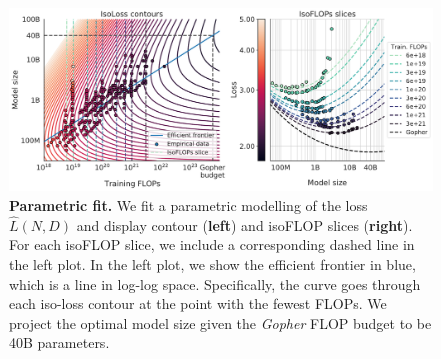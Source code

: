 \documentclass[11pt, a4paper, logo, copyright, nonumbering]{deepmind}
\newcommand{\gopher}{\textit{Gopher}\xspace}
\begin{document}
\begin{figure}
    \centering
    \includegraphics[width=\textwidth]{figures/approach_3_v2.pdf}
    \caption{\textbf{Parametric fit.} We fit a parametric modelling of the loss $\hat L(N,D)$ and display contour (\textbf{left}) and isoFLOP slices (\textbf{right}).
    For each isoFLOP slice, we include a corresponding dashed line in the left plot.
    In the left plot, we show the efficient frontier in blue, which is a line in log-log space. 
    Specifically, the curve goes through each iso-loss contour at the point with the fewest FLOPs.
    We project the optimal model size given the \gopher FLOP budget to be 40B parameters.}
    \label{fig:approach_3}
\end{figure}
\end{document}
